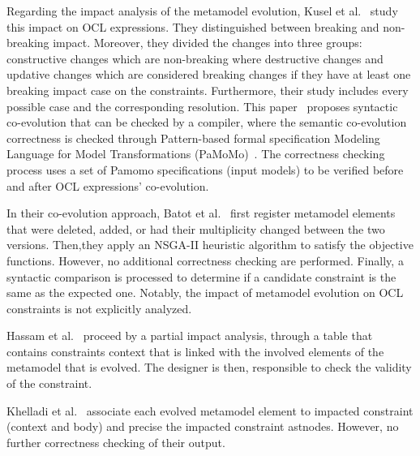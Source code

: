  Regarding the impact analysis of the metamodel evolution, Kusel et al.~\cite{kusel2014systematic} study this impact on OCL expressions. They distinguished between breaking and non-breaking impact. Moreover, they divided the changes into three groups: constructive changes which are non-breaking where destructive changes and updative changes which are considered breaking changes if they have at least one breaking impact case on the constraints. Furthermore, their study includes %
  every possible case and the corresponding resolution. This paper~\cite{kusel2014systematic} proposes syntactic co-evolution that can be checked by a compiler, where the semantic co-evolution correctness is checked through Pattern-based formal specification Modeling Language for Model Transformations (PaMoMo)~\cite{10.1007/s10515-012-0102-y}. The correctness checking process uses a set of Pamomo specifications (input models) to be verified before and after OCL expressions' co-evolution.

In their co-evolution approach, Batot et al.~\cite{batot2017heuristic} first register metamodel elements that were deleted, added, or had their multiplicity changed between the two versions. %
 Then,they apply an NSGA-II heuristic algorithm to satisfy the objective functions. However, no additional correctness checking are performed. Finally, a syntactic comparison is processed to determine if a candidate constraint is the same as the expected one. Notably, the impact of metamodel evolution on OCL constraints is not explicitly analyzed.
  
   
  
 
Hassam et al.~\cite{hassam2011assistance} proceed by a partial impact analysis, through a table that contains constraints context that is linked with the involved elements of the metamodel that is evolved. The designer is then, responsible to check the validity of the constraint. 

Khelladi et al.~\cite{khelladi2017semi} associate each evolved metamodel element to impacted constraint (context and body)  and precise the impacted constraint astnodes. However, no further correctness checking of their output.

